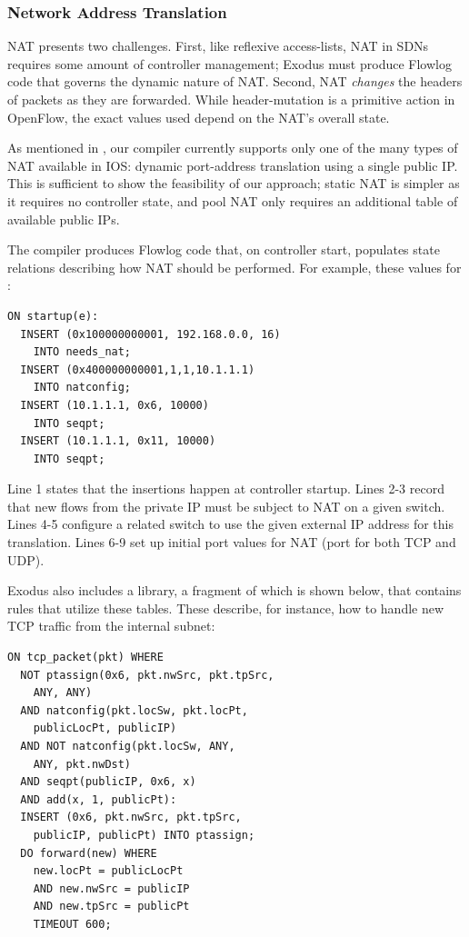\subsubsection{Network Address Translation}

NAT presents two challenges. First, like reflexive access-lists, NAT
in SDNs requires some amount of controller management; Exodus must
produce Flowlog code that governs the dynamic nature of NAT. Second, NAT
\emph{changes} the headers of packets as they are forwarded. While
header-mutation is a primitive action in OpenFlow, the exact values
used depend on the NAT's overall state.

As mentioned in , our compiler currently supports only one of
the many types of NAT available in IOS: dynamic port-address translation using
a single public IP. This is sufficient to show the feasibility of our
approach; static NAT is simpler as it requires no controller state,
and pool NAT only requires an additional table of available public IPs.

The compiler produces Flowlog code that, on controller start, populates
state relations describing how NAT should be performed. For example,
these values for :
\begin{lstlisting}[label=lst:flowlog-nat-startup,language=Flowlog]
ON startup(e):
  INSERT (0x100000000001, 192.168.0.0, 16) 
    INTO needs_nat;
  INSERT (0x400000000001,1,1,10.1.1.1) 
    INTO natconfig;
  INSERT (10.1.1.1, 0x6, 10000) 
    INTO seqpt; 
  INSERT (10.1.1.1, 0x11, 10000) 
    INTO seqpt; 
\end{lstlisting}

\noindent
Line 1 states that the insertions happen at controller
startup. Lines 2-3 record that new flows from the private IP
 must be subject to NAT on a given switch. Lines 4-5 configure a
related switch to use the given external IP address for this
translation. Lines 6-9 set up initial port values for NAT (port
 for both TCP and UDP).

Exodus also includes a library, a fragment of which is shown below, that
contains rules that utilize these
tables. These describe, for instance, how to handle new TCP traffic from the
internal subnet:

\noindent %
\begin{lstlisting}[label=lst:flowlog-nat-port-assign,language=Flowlog]
ON tcp_packet(pkt) WHERE 
  NOT ptassign(0x6, pkt.nwSrc, pkt.tpSrc, 
    ANY, ANY)
  AND natconfig(pkt.locSw, pkt.locPt,
    publicLocPt, publicIP) 
  AND NOT natconfig(pkt.locSw, ANY, 
    ANY, pkt.nwDst) 
  AND seqpt(publicIP, 0x6, x) 
  AND add(x, 1, publicPt):
  INSERT (0x6, pkt.nwSrc, pkt.tpSrc,
    publicIP, publicPt) INTO ptassign;
  DO forward(new) WHERE
    new.locPt = publicLocPt 
    AND new.nwSrc = publicIP 
    AND new.tpSrc = publicPt
    TIMEOUT 600;
\end{lstlisting}

